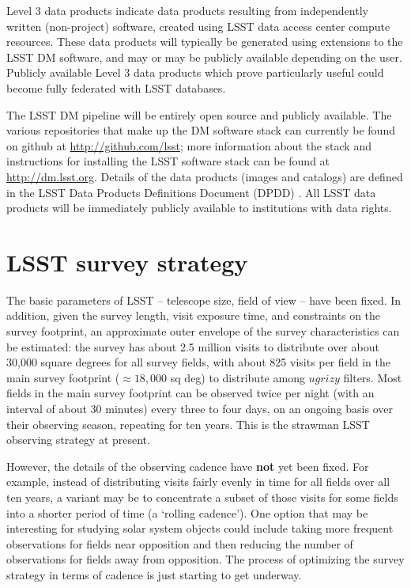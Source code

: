\documentclass{iau}
\begin{document}
Level 3 data products indicate data products resulting from
independently written (non-project) software, created using LSST data
access center compute resources. These data products will typically be
generated using extensions to the LSST DM software, and may or may be
publicly available depending on the user. Publicly available Level 3
data products which prove particularly useful could become fully
federated with LSST databases.

The LSST DM pipeline will be entirely open source and publicly
available. The various repositories that make up the DM software stack
can currently be found on github at \url{http://github.com/lsst};
more information about the stack and instructions for installing the
LSST software stack can be found at \url{http://dm.lsst.org}. Details
of the data products (images and catalogs) are defined in the LSST
Data Products Definitions Document (DPDD) \cite{LSST_DPDD}. All LSST
data products will be immediately publicly available to institutions
with data rights.

\section{LSST survey strategy}
\label{surveystrategy}

The basic parameters of LSST -- telescope
size, field of view -- have been fixed. In
addition, given the survey length, visit exposure time, and constraints on the survey
footprint, an approximate outer envelope of the survey characteristics can be
estimated: the survey has about 2.5 million visits to
distribute over about 30,000 square degrees for all survey fields,
with about 825 visits per field in the main survey footprint
($\approx18,000$ sq deg) to distribute among $ugrizy$ filters. Most
fields in the main survey footprint can be observed twice per night
(with an interval of about 30 minutes) every three to four days, on an
ongoing basis over their observing season, repeating for ten
years. This is the strawman LSST observing strategy at present.

However, the details of the observing cadence have {\bf not} yet been
fixed. For example, instead of distributing visits fairly evenly in time for all
fields over all ten years, a variant may be to
concentrate a subset of those visits for some fields into a shorter
period of time (a `rolling cadence'). One option that may be interesting for
studying solar system objects could include taking more frequent
observations for fields near opposition and then reducing the number
of observations for fields away from opposition. The process of
optimizing the survey strategy in terms of cadence is just starting to
get underway.
\end{document}
